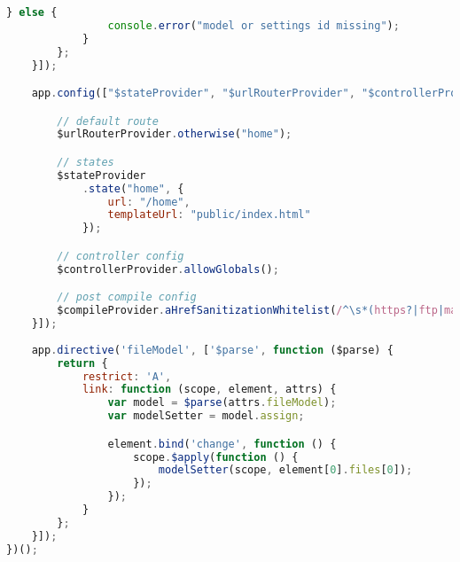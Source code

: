 \begin{lstlisting}[language=JavaScript, label={lst:app}, caption=Main app code where the angular module WebSlicer is defined. This is similar to a main function in C++.]
            } else {
                console.error("model or settings id missing");
            }
        };
    }]);

    app.config(["$stateProvider", "$urlRouterProvider", "$controllerProvider", "$compileProvider", function appConfig($stateProvider, $urlRouterProvider, $controllerProvider, $compileProvider) {

        // default route
        $urlRouterProvider.otherwise("home");

        // states
        $stateProvider
            .state("home", {
                url: "/home",
                templateUrl: "public/index.html"
            });

        // controller config
        $controllerProvider.allowGlobals();

        // post compile config
        $compileProvider.aHrefSanitizationWhitelist(/^\s*(https?|ftp|mailto|tel|file|blob):/);
    }]);
    
    app.directive('fileModel', ['$parse', function ($parse) {
        return {
            restrict: 'A',
            link: function (scope, element, attrs) {
                var model = $parse(attrs.fileModel);
                var modelSetter = model.assign;

                element.bind('change', function () {
                    scope.$apply(function () {
                        modelSetter(scope, element[0].files[0]);
                    });
                });
            }
        };
    }]);
})();
\end{lstlisting}


